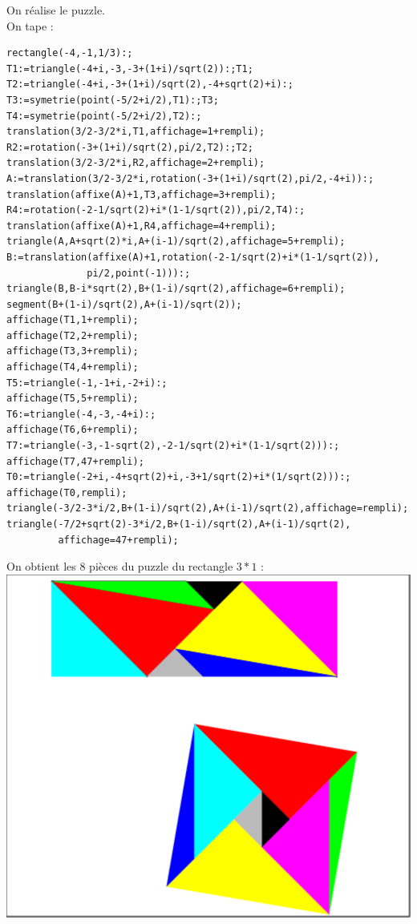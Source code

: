\documentclass[a4paper,11pt]{book}
\begin{document}
On r\'ealise le puzzle.\\
On tape :
\begin{verbatim}
rectangle(-4,-1,1/3):;
T1:=triangle(-4+i,-3,-3+(1+i)/sqrt(2)):;T1;
T2:=triangle(-4+i,-3+(1+i)/sqrt(2),-4+sqrt(2)+i):;
T3:=symetrie(point(-5/2+i/2),T1):;T3;
T4:=symetrie(point(-5/2+i/2),T2):;
translation(3/2-3/2*i,T1,affichage=1+rempli);
R2:=rotation(-3+(1+i)/sqrt(2),pi/2,T2):;T2;
translation(3/2-3/2*i,R2,affichage=2+rempli);
A:=translation(3/2-3/2*i,rotation(-3+(1+i)/sqrt(2),pi/2,-4+i)):;
translation(affixe(A)+1,T3,affichage=3+rempli);
R4:=rotation(-2-1/sqrt(2)+i*(1-1/sqrt(2)),pi/2,T4):;
translation(affixe(A)+1,R4,affichage=4+rempli);
triangle(A,A+sqrt(2)*i,A+(i-1)/sqrt(2),affichage=5+rempli);
B:=translation(affixe(A)+1,rotation(-2-1/sqrt(2)+i*(1-1/sqrt(2)),
              pi/2,point(-1))):;
triangle(B,B-i*sqrt(2),B+(1-i)/sqrt(2),affichage=6+rempli);
segment(B+(1-i)/sqrt(2),A+(i-1)/sqrt(2));
affichage(T1,1+rempli);
affichage(T2,2+rempli);
affichage(T3,3+rempli);
affichage(T4,4+rempli);
T5:=triangle(-1,-1+i,-2+i):;
affichage(T5,5+rempli);
T6:=triangle(-4,-3,-4+i):;
affichage(T6,6+rempli);
T7:=triangle(-3,-1-sqrt(2),-2-1/sqrt(2)+i*(1-1/sqrt(2))):;
affichage(T7,47+rempli);
T0:=triangle(-2+i,-4+sqrt(2)+i,-3+1/sqrt(2)+i*(1/sqrt(2))):;
affichage(T0,rempli);
triangle(-3/2-3*i/2,B+(1-i)/sqrt(2),A+(i-1)/sqrt(2),affichage=rempli);
triangle(-7/2+sqrt(2)-3*i/2,B+(1-i)/sqrt(2),A+(i-1)/sqrt(2),
         affichage=47+rempli);
\end{verbatim}
On obtient les 8 pi\`eces du puzzle du rectangle $3*1$ :\\
\includegraphics[width=\textwidth]{carresqrt3}
\end{document}
